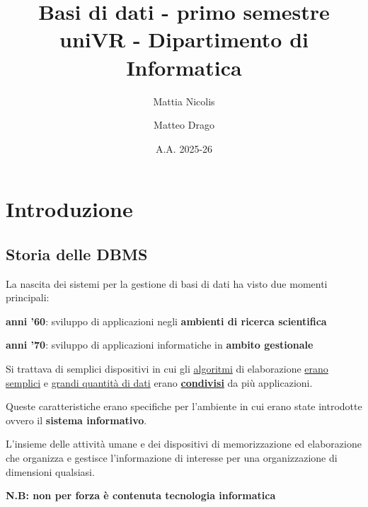 \documentclass[a4paper, 12pt]{book}
\title{\textbf{Basi di dati - primo semestre}\\uniVR - Dipartimento di Informatica}
\author{Mattia Nicolis \and Matteo Drago}
\date{A.A. 2025-26}
\begin{document}
    \maketitle

    \tableofcontents
    \markboth{}{}


    \chapter*{Introduzione}

    \section*{Storia delle DBMS}


    La nascita dei sistemi per la gestione di basi di dati ha visto due momenti principali:
    \begin{description}   %
      \item \textbf{anni '60}: sviluppo di applicazioni negli \textbf{ambienti di ricerca scientifica}
      \item \textbf{anni '70}: sviluppo di applicazioni informatiche in \textbf{ambito gestionale}
    \end{description}

    Si trattava di semplici dispositivi in cui gli \uline{algoritmi} di elaborazione \uline{erano semplici} e \uline{grandi quantità di dati} erano \uline{\textbf{condivisi}} da più applicazioni.
    
    Queste caratteristiche erano specifiche per l'ambiente in cui erano state introdotte ovvero il \textbf{sistema informativo}.



    \vspace{15pt}

    \begin{tcolorbox}[
      colback=cyan!5!white,
      colframe=blue!50!black,
      title=\textbf{Definizione - Sistema informativo},
      coltitle=white,
      fonttitle=\bfseries,
      arc=3mm,
      boxrule=0.5pt,
      enhanced,
      breakable
    ]
    L'insieme delle attività umane e dei dispositivi di memorizzazione ed elaborazione che organizza e gestisce l'informazione di interesse per una organizzazione di dimensioni qualsiasi.\\
    
    \vspace{0.5mm}
    
    \textbf{N.B: non per forza è contenuta tecnologia informatica}
    \end{tcolorbox}
\end{document}
